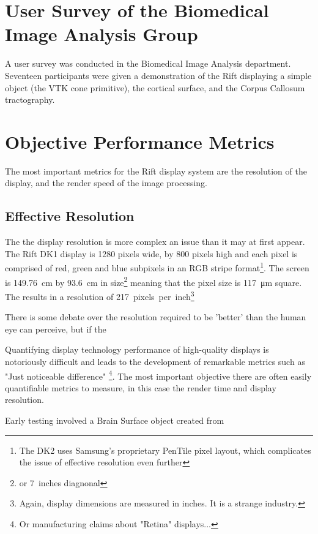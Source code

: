 \documentclass[MSc,paper=a4,pagesize=auto]{icldt}
\begin{document}
\section{User Survey of the Biomedical Image Analysis Group}
A user survey was conducted in the Biomedical Image Analysis department. Seventeen participants were given a demonstration of the Rift displaying a simple object (the VTK cone primitive), the cortical surface, and the Corpus Callosum tractography. 




\section{Objective Performance Metrics}

The most important metrics for the Rift display system are the resolution of the display, and the render speed of the image processing.

\subsection{Effective Resolution}
The the display resolution is more complex an issue than it may at first appear. The Rift DK1 display is 1280 pixels wide, by 800 pixels high and each pixel is comprised of red, green and blue subpixels in an RGB stripe format\footnote{The DK2 uses Samsung's proprietary PenTile pixel layout, which complicates the issue of effective resolution even further}. The screen is \SI{149.76}{cm} by \SI{93.6}{cm} in size\footnote{or \SI{7}{inches} diagnonal} meaning that the pixel size is \SI{117}{\um} square. The results in a resolution of \SI{217}{pixels per inch}\footnote{Again, display dimensions are measured in inches. It is a strange industry.}

There is some debate over the resolution required to be 'better' than the human eye can perceive, but if the 



Quantifying display technology performance of high-quality displays is notoriously difficult and leads to the development of remarkable metrics such as "Just noticeable difference"\cite{Zhang2008} \footnote{Or manufacturing claims about "Retina" displays...}. The most important objective there are often easily quantifiable metrics to measure, in this case the render time and display resolution.

Early testing involved a Brain Surface object created from  
\end{document}
